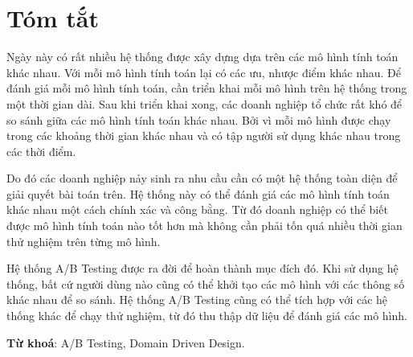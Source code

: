 \chapter*{Tóm tắt}

Ngày này có rất nhiều hệ thống được xây dựng dựa trên các mô hình tính toán khác nhau.
Với mỗi mô hình tính toán lại có các ưu, nhược điểm khác nhau.
Để đánh giá mỗi mô hình tính toán, cần triển khai mỗi mô hình trên hệ thống trong một thời gian dài.
Sau khi triển khai xong, các doanh nghiệp tổ chức rất khó để so sánh giữa các mô hình tính toán khác nhau.
Bởi vì mỗi mô hình được chạy trong các khoảng thời gian khác nhau và có tập người sử dụng khác nhau
trong các thời điểm.

Do đó các doanh nghiệp nảy sinh ra nhu cầu cần có một hệ thống toàn diện để giải quyết bài toán trên.
Hệ thống này có thể đánh giá các mô hình tính toán khác nhau một cách chính xác và công bằng.
Từ đó doanh nghiệp có thể biết được mô hình tính toán nào tốt hơn mà không cần phải tốn quá nhiều
thời gian thử nghiệm trên từng mô hình.

Hệ thống A/B Testing được ra đời để hoàn thành mục đích đó. Khi sử dụng hệ thống, bất cứ người dùng
nào cũng có thể khởi tạo các mô hình với các thông số khác nhau để so sánh. Hệ thống A/B Testing cũng
có thể tích hợp với các hệ thống khác để chạy thử nghiệm, từ đó thu thập dữ liệu để đánh giá các mô
hình.

\textbf{Từ khoá}: A/B Testing, Domain Driven Design.
